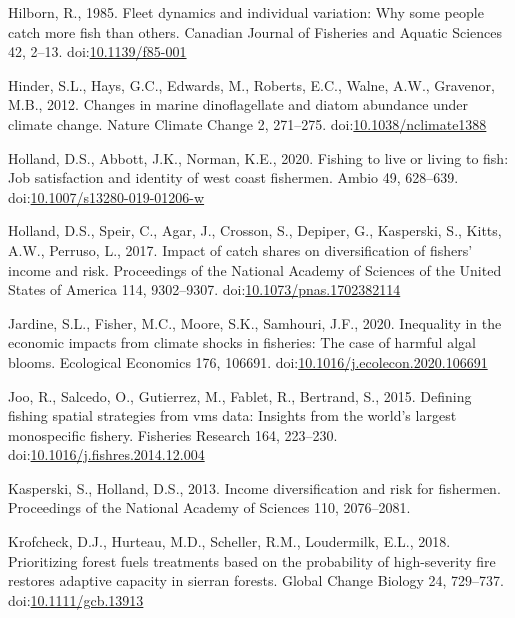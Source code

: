 \documentclass[]{elsarticle} %
\begin{document}
\leavevmode\hypertarget{ref-Hilborn1985}{}%
Hilborn, R., 1985. Fleet dynamics and individual variation: Why some
people catch more fish than others. Canadian Journal of Fisheries and
Aquatic Sciences 42, 2--13.
doi:\href{https://doi.org/10.1139/f85-001}{10.1139/f85-001}

\leavevmode\hypertarget{ref-Hinder2012}{}%
Hinder, S.L., Hays, G.C., Edwards, M., Roberts, E.C., Walne, A.W.,
Gravenor, M.B., 2012. Changes in marine dinoflagellate and diatom
abundance under climate change. Nature Climate Change 2, 271--275.
doi:\href{https://doi.org/10.1038/nclimate1388}{10.1038/nclimate1388}

\leavevmode\hypertarget{ref-Holland2020}{}%
Holland, D.S., Abbott, J.K., Norman, K.E., 2020. Fishing to live or
living to fish: Job satisfaction and identity of west coast fishermen.
Ambio 49, 628--639.
doi:\href{https://doi.org/10.1007/s13280-019-01206-w}{10.1007/s13280-019-01206-w}

\leavevmode\hypertarget{ref-Holland2017}{}%
Holland, D.S., Speir, C., Agar, J., Crosson, S., Depiper, G., Kasperski,
S., Kitts, A.W., Perruso, L., 2017. Impact of catch shares on
diversification of fishers' income and risk. Proceedings of the National
Academy of Sciences of the United States of America 114, 9302--9307.
doi:\href{https://doi.org/10.1073/pnas.1702382114}{10.1073/pnas.1702382114}

\leavevmode\hypertarget{ref-Jardine2020}{}%
Jardine, S.L., Fisher, M.C., Moore, S.K., Samhouri, J.F., 2020.
Inequality in the economic impacts from climate shocks in fisheries: The
case of harmful algal blooms. Ecological Economics 176, 106691.
doi:\href{https://doi.org/10.1016/j.ecolecon.2020.106691}{10.1016/j.ecolecon.2020.106691}

\leavevmode\hypertarget{ref-Joo2015}{}%
Joo, R., Salcedo, O., Gutierrez, M., Fablet, R., Bertrand, S., 2015.
Defining fishing spatial strategies from vms data: Insights from the
world's largest monospecific fishery. Fisheries Research 164, 223--230.
doi:\href{https://doi.org/10.1016/j.fishres.2014.12.004}{10.1016/j.fishres.2014.12.004}

\leavevmode\hypertarget{ref-Kasperski2013}{}%
Kasperski, S., Holland, D.S., 2013. Income diversification and risk for
fishermen. Proceedings of the National Academy of Sciences 110,
2076--2081.

\leavevmode\hypertarget{ref-Krofcheck2018}{}%
Krofcheck, D.J., Hurteau, M.D., Scheller, R.M., Loudermilk, E.L., 2018.
Prioritizing forest fuels treatments based on the probability of
high-severity fire restores adaptive capacity in sierran forests. Global
Change Biology 24, 729--737.
doi:\href{https://doi.org/10.1111/gcb.13913}{10.1111/gcb.13913}
\end{document}
